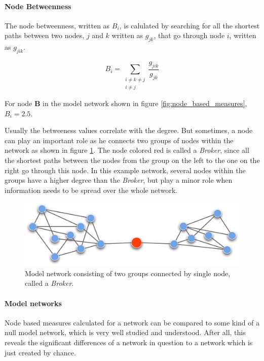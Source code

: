 \paragraph{Node Betweenness}

The node betweenness, written as $B_i$, is calulated by searching for all the shortest paths between two nodes, $j$ and $k$ written as $g_{jk}$, that go through node $i$, written as $g_{jik}$.

\begin{equation}
B_i =	\sum_{
			\substack{i \neq k \neq j \\ i \neq j}
		}
		\frac{g_{jik}}{g_{jk}}
\end{equation}

For node \textbf{B} in the model network shown in figure \ref{fig:node_based_measures}, $B_i = 2.5$.

Usually the betweeness values correlate with the degree. But sometimes, a node can play an important role as he connects two groups of nodes within the network as shown in figure \ref{fig:broker}. The node colored red is called a \textit{Broker}, since all the shortest paths between the nodes from the group on the left to the one on the right go through this node. In this example network, several nodes within the groups have a higher degree than the \textit{Broker}, but play a minor role when information needs to be spread over the whole network.   

\begin{figure}[htpb]
\begin{center}
  \includegraphics[width=.75\textwidth]{assets/pdf/broker.pdf}
  \caption[Model network consisting of two groups]{Model network consisting of two groups connected by single node, called a \textit{Broker}.}
  \label{fig:broker}
\end{center}
\end{figure}

\paragraph{Model networks}
\label{para:model_networks}

Node based measures calculated for a network can be compared to some kind of a null model network, which is very well studied and understood. After all, this reveals the significant differences of a network in question to a network which is just created by chance.

